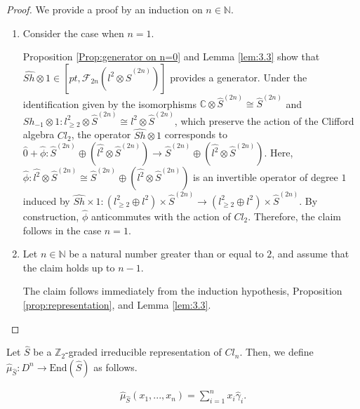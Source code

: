 \documentclass{amsart}
\theoremstyle{definition}
\theoremstyle{remark}
\begin{document}
\begin{proof}
We provide a proof by an induction on $n\in \mathbb{N}$.

\begin{enumerate}
\item Consider the case when $n = 1$.

Proposition \ref{Prop:generator on n=0} and Lemma \ref{lem:3.3} show that $\hat{Sh} \otimes 1 \in [pt, \mathcal{F}_{2n}(l^2 \otimes \hat{S}^{(2n)})]$ provides a generator. Under the identification given by the isomorphisms $\mathbb{C} \otimes \hat{S}^{(2n)} \cong \hat{S}^{(2n)}$ and $Sh_{-1}\otimes 1 \colon l^2_{\ge 2}\otimes \hat{S}^{(2n)} \cong l^2 \otimes \hat{S}^{(2n)}$, which preserve the action of the Clifford algebra $Cl_2$, the operator $\hat{Sh} \otimes 1$ corresponds to $\hat{0} + \hat{\phi} \colon \hat{S}^{(2n)} \oplus (\hat{l^2}\otimes \hat{S}^{(2n)})\to \hat{S}^{(2n)} \oplus (\hat{l^2}\otimes \hat{S}^{(2n)})$. Here, $\hat{\phi}: \hat{l^2} \otimes \hat{S}^{(2n)} \cong \hat{S}^{(2n)} \oplus (\hat{l^2} \otimes \hat{S}^{(2n)})$ is an invertible operator of degree $1$ induced by $\hat{Sh} \times 1: (l^2_{\ge 2}\oplus l^2) \times \hat{S}^{(2n)} \to (l^2_{\ge 2}\oplus l^2) \times \hat{S}^{(2n)}$. By construction, $\hat{\phi}$ anticommutes with the action of $Cl_2$. Therefore, the claim follows in the case $n = 1$.

\item Let $n\in \mathbb{N}$ be a natural number greater than or equal to $2$, and assume that the claim holds up to $n-1$.

The claim follows immediately from the induction hypothesis, Proposition \ref{prop:representation}, and Lemma \ref{lem:3.3}.
\end{enumerate}
\end{proof}

Let $\hat{S}$ be a $\mathbb{Z}_2$-graded irreducible representation of $Cl_{n}$. Then, we define $\hat{\mu}_{\hat{S}}: D^n \to \text{End}(\hat{S})$ as follows.

\begin{align*}
\hat{\mu}_{\hat{S}}(x_1,...,x_n)=\sum_{i=1}^{n} x_i \hat{\gamma}_i.
\end{align*}
\end{document}

